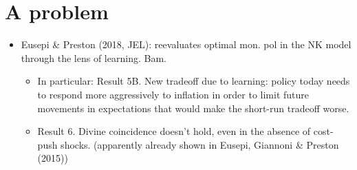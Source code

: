 \documentclass[11pt]{article}
\renewcommand{\[}{\begin{equation}}
\renewcommand{\]}{\end{equation}}
\begin{document}
\section{A problem}
\begin{itemize}
\item Eusepi \& Preston (2018, JEL): reevaluates optimal mon. pol in the NK model through the lens of learning. Bam. 
\begin{itemize}
\item In particular: Result 5B. New tradeoff due to learning: policy today needs to respond more aggressively to inflation in order to limit future movements in expectations that would make the short-run tradeoff worse. 
\item Result 6. Divine coincidence doesn't hold, even in the absence of cost-push shocks. (apparently already shown in Eusepi, Giannoni \& Preston (2015))
\end{itemize}
\end{itemize}



 
\end{document}
